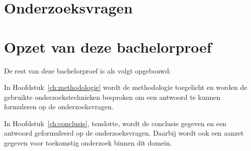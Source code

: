\section{Onderzoeksvragen}
\label{sec:onderzoeksvragen}


\section{Opzet van deze bachelorproef}
\label{sec:opzet-bachelorproef}


De rest van deze bachelorproef is als volgt opgebouwd:

In Hoofdstuk~\ref{ch:methodologie} wordt de methodologie toegelicht en worden de gebruikte onderzoekstechnieken besproken om een antwoord te kunnen formuleren op de onderzoeksvragen.


In Hoofdstuk~\ref{ch:conclusie}, tenslotte, wordt de conclusie gegeven en een antwoord geformuleerd op de onderzoeksvragen. Daarbij wordt ook een aanzet gegeven voor toekomstig onderzoek binnen dit domein.

